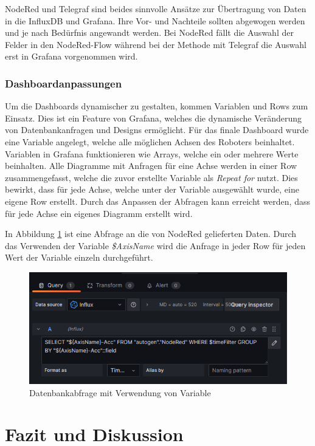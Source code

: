 \documentclass[a4paper, 12pt, oneside, toc=listofnumbered, bibliography=totoc]{scrbook}
\begin{document}
		NodeRed und Telegraf sind beides sinnvolle Ansätze zur Übertragung von Daten in die InfluxDB und Grafana. Ihre Vor- und Nachteile sollten abgewogen werden und je nach Bedürfnis angewandt werden. Bei NodeRed fällt die Auswahl der Felder in den NodeRed-Flow während bei der Methode mit Telegraf die Auswahl erst in Grafana vorgenommen wird.
		
		\subsection{Dashboardanpassungen}
		
		Um die Dashboards dynamischer zu gestalten, kommen Variablen und Rows zum Einsatz. Dies ist ein Feature von Grafana, welches die dynamische Veränderung von Datenbankanfragen und Designs ermöglicht. Für das finale Dashboard wurde eine Variable angelegt, welche alle möglichen Achsen des Roboters beinhaltet. Variablen in Grafana funktionieren wie Arrays, welche ein oder mehrere Werte beinhalten. Alle Diagramme mit Anfragen für eine Achse werden in einer Row zusammengefasst, welche die zuvor erstellte Variable als \textit{Repeat for} nutzt. Dies bewirkt, dass für jede Achse, welche unter der Variable ausgewählt wurde, eine eigene Row erstellt. Durch das Anpassen der Abfragen kann erreicht werden, dass für jede Achse ein eigenes Diagramm erstellt wird.
		
		In Abbildung \ref{fig:variables} ist eine Abfrage an die von NodeRed gelieferten Daten. Durch das Verwenden der Variable \textit{\${AxisName}} wird die Anfrage in jeder Row für jeden Wert der Variable einzeln durchgeführt.
		
		\begin{figure}[H]
			\centering
			\includegraphics[width=0.9\linewidth]{res/variables.png}
			\caption{Datenbankabfrage mit Verwendung von Variable}
			\label{fig:variables}
		\end{figure}
			
	\chapter{Fazit und Diskussion}\label{ch:Diskussion_Fazit}
	
\end{document}
